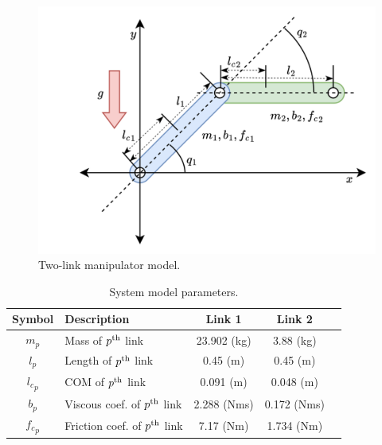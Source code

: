 \documentclass[lettersize,journal]{IEEEtran}
\begin{document}
\begin{figure}[!t]
    \centering
    \includegraphics[width=0.7\linewidth]{fig/RobotModel.drawio.png}
    \caption{Two-link manipulator model.}
    \label{fig: manipulator}
\end{figure}

\begin{table}[!t]
    \renewcommand{\arraystretch}{1.3}
    \caption{System model parameters.}
    \centering
    \begin{tabular}{c m{11em} c c c }
    \hline
    \textbf{Symbol} & \textbf{Description} & \textbf{Link 1} & \textbf{Link 2} \\
    \hline
    \hline 
    $m_p$ & Mass of $p\textsuperscript{th}$ link    & 23.902 (kg) & 3.88 (kg) \\
    \hline
    $l_p$  & Length of $p\textsuperscript{th}$ link   & 0.45 (m) & 0.45 (m) \\
    \hline
    ${l_c}_p$ & COM of $p\textsuperscript{th}$ link  & 0.091 (m) & 0.048 (m) \\
    \hline
    $b_p$   & Viscous coef. of $p\textsuperscript{th}$ link  &  2.288 (Nms) & 0.172 (Nms) \\
    \hline
    ${f_c}_p$  & Friction coef. of $p\textsuperscript{th}$ link &  7.17 (Nm) & 1.734 (Nm) \\
    \hline
    \end{tabular}
    \label{table: system parameters}
\end{table}
\end{document}
